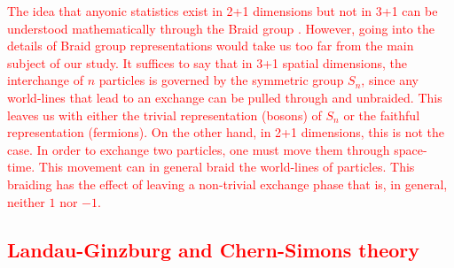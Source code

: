  \textcolor{red}{The idea that anyonic statistics exist in 2+1 dimensions but not in 3+1 can be understood mathematically through the Braid group \cite{PhysRevLett.52.2103, Artin1947}. However, going into the details of Braid group representations would take us too far from the main subject of our study. It suffices to say that in 3+1 spatial dimensions, the interchange of $n$ particles is governed by the symmetric group $S_n$, since any world-lines that lead to an exchange can be pulled through and unbraided. This leaves us with either the trivial representation (bosons) of $S_n$ or the faithful representation (fermions). On the other hand, in 2+1 dimensions, this is not the case. In order to exchange two particles, one must move them through space-time. This movement can in general braid the world-lines of particles. This braiding has the effect of leaving a non-trivial exchange phase that is, in general, neither $1$ nor $-1$.}


\textcolor{red}{\subsection{Landau-Ginzburg and Chern-Simons theory}}


